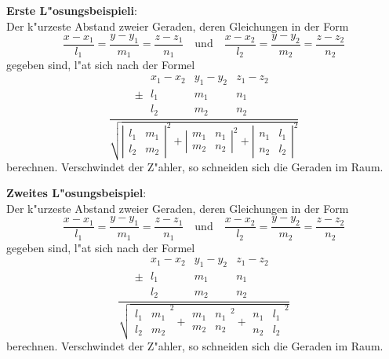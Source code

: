 \documentclass{article}
\begin{document}
\noindent\textbf{Erste L"osungsbeispieli}:\\[1ex]
Der k"urzeste Abstand zweier Geraden, deren Gleichungen
in der Form
\[ \frac{x-x_1}{l_1} = \frac{y-y_1}{m_1} = \frac{z-z_1}{n_1}\quad\mbox{und}%
\quad%
   \frac{x-x_2}{l_2} = \frac{y-y_2}{m_2} = \frac{z-z_2}{n_2}               \]
gegeben sind, l"a\3t sich nach der Formel
\[ \frac{\pm\;\begin{array}{|ccc|}
     x_1 - x_2 & y_1 - y_2 & z_1 - z_2 \\
	 l_1   &     m_1   &    n_1    \\
	 l_2   &     m_2   &    n_2
    \end{array}}{
    \sqrt{\left|\begin{array}{cc} l_1 & m_1 \\ l_2 & m_2 \end{array}\right|^2
	+ \left|\begin{array}{cc} m_1 & n_1 \\ m_2 & n_2 \end{array}\right|^2
	+ \left|\begin{array}{cc} n_1 & l_1 \\ n_2 & l_2 \end{array}\right|^2}
		}   \]
berechnen. Verschwindet der Z"ahler, so schneiden sich die Geraden im Raum.

\bigskip
\noindent\textbf{Zweites L"osungsbeispiel}:\\[1ex]
Der k"urzeste Abstand zweier Geraden, deren Gleichungen
in der Form
\[ \frac{x-x_1}{l_1} = \frac{y-y_1}{m_1} = \frac{z-z_1}{n_1}\quad\mbox{und}%
\quad%
   \frac{x-x_2}{l_2} = \frac{y-y_2}{m_2} = \frac{z-z_2}{n_2}               \]
gegeben sind, l"a\3t sich nach der Formel
\[ \frac{\pm\;\begin{array}{|ccc|}
     x_1 - x_2 & y_1 - y_2 & z_1 - z_2 \\
	 l_1   &     m_1   &    n_1    \\
	 l_2   &     m_2   &    n_2
    \end{array}}{
    \sqrt{\begin{array}{|cc|} l_1 & m_1 \\ l_2 & m_2 \end{array}^2
	    + \begin{array}{|cc|} m_1 & n_1 \\ m_2 & n_2 \end{array}^2
	    + \begin{array}{|cc|} n_1 & l_1 \\ n_2 & l_2 \end{array}^2}
		}   \]
berechnen. Verschwindet der Z"ahler, so schneiden sich die Geraden im Raum.
\end{document}
